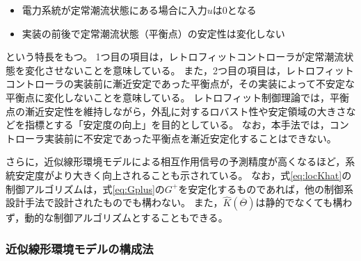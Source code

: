 \documentclass[tombow,dvipdfmx]{corona-a5-1.1}
\begin{document}
\begin{itemize}
\item 電力系統が定常潮流状態にある場合に入力$u$は0となる
\item 実装の前後で定常潮流状態（平衡点）の安定性は変化しない
\end{itemize}
という特長をもつ。
1つ目の項目は，レトロフィットコントローラが定常潮流状態を変化させないことを意味している。
また，2つ目の項目は，レトロフィットコントローラの実装前に漸近安定であった平衡点が，その実装によって不安定な平衡点に変化しないことを意味している。
レトロフィット制御理論では，平衡点の漸近安定性を維持しながら，外乱に対するロバスト性や安定領域の大きさなどを指標とする「安定度の向上」を目的としている。
なお，本手法では，コントローラ実装前に不安定であった平衡点を漸近安定化することはできない。

さらに，近似線形環境モデルによる相互作用信号の予測精度が高くなるほど，系統安定度がより大きく向上されることも示されている。
なお，式\ref{eq:locKhat}の制御アルゴリズムは，式\ref{eq:Gplus}の$G^+$を安定化するものであれば，他の制御系設計手法で設計されたものでも構わない。
また，$\hat{K}(\overline{\mathit{\Theta}})$は静的でなくても構わず，動的な制御アルゴリズムとすることもできる\cite{ishizaki2019retrofit}。


\smallskip
\subsubsection{近似線形環境モデルの構成法}
\end{document}
